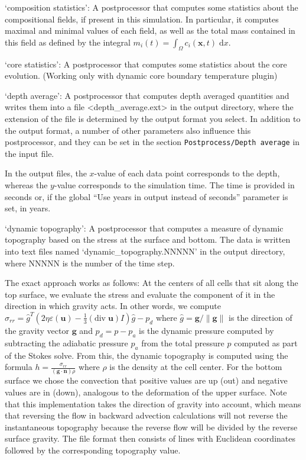 \begin{itemize}
`composition statistics': A postprocessor that computes some statistics about the compositional fields, if present in this simulation. In particular, it computes maximal and minimal values of each field, as well as the total mass contained in this field as defined by the integral $m_i(t) = \int_\Omega c_i(\mathbf x,t) \; \text{d}x$.

`core statistics': A postprocessor that computes some statistics about the core evolution. (Working only with dynamic core boundary temperature plugin)

`depth average': A postprocessor that computes depth averaged quantities and writes them into a file <depth_average.ext> in the output directory, where the extension of the file is determined by the output format you select. In addition to the output format, a number of other parameters also influence this postprocessor, and they can be set in the section \texttt{Postprocess/Depth average} in the input file.

In the output files, the $x$-value of each data point corresponds to the depth, whereas the $y$-value corresponds to the simulation time. The time is provided in seconds or, if the global ``Use years in output instead of seconds'' parameter is set, in years.

`dynamic topography': A postprocessor that computes a measure of dynamic topography based on the stress at the surface and bottom. The data is written into text files named `dynamic\_topography.NNNNN' in the output directory, where NNNNN is the number of the time step.

The exact approach works as follows: At the centers of all cells that sit along the top surface, we evaluate the stress and evaluate the component of it in the direction in which gravity acts. In other words, we compute $\sigma_{rr}={\hat g}^T(2 \eta \varepsilon(\mathbf u)- \frac 13 (\textrm{div}\;\mathbf u)I)\hat g - p_d$ where $\hat g = \mathbf g/\|\mathbf g\|$ is the direction of the gravity vector $\mathbf g$ and $p_d=p-p_a$ is the dynamic pressure computed by subtracting the adiabatic pressure $p_a$ from the total pressure $p$ computed as part of the Stokes solve. From this, the dynamic topography is computed using the formula $h=\frac{\sigma_{rr}}{(\mathbf g \cdot \mathbf n)  \rho}$ where $\rho$ is the density at the cell center. For the bottom surface we chose the convection that positive values are up (out) and negative values are in (down), analogous to the deformation of the upper surface. Note that this implementation takes the direction of gravity into account, which means that reversing the flow in backward advection calculations will not reverse the instantaneous topography because the reverse flow will be divided by the reverse surface gravity.  
The file format then consists of lines with Euclidean coordinates followed by the corresponding topography value.


\end{itemize}
